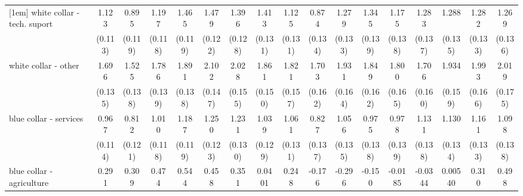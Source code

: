 {\begin{tabular}{l*{16}{c}}
[1em]
white collar - tech. suport&       1.123\sym{***}&       0.895\sym{***}&       1.197\sym{***}&       1.465\sym{***}&       1.479\sym{***}&       1.396\sym{***}&       1.413\sym{***}&       1.125\sym{***}&       0.874\sym{***}&       1.279\sym{***}&       1.345\sym{***}&       1.175\sym{***}&       1.283\sym{***}&       1.288\sym{***}&       1.282\sym{***}&       1.269\sym{***}\\
                    &     (0.113)         &     (0.119)         &     (0.118)         &     (0.119)         &     (0.122)         &     (0.128)         &     (0.131)         &     (0.131)         &     (0.134)         &     (0.133)         &     (0.139)         &     (0.138)         &     (0.137)         &     (0.135)         &     (0.133)         &     (0.136)         \\
[1em]
white collar - other&       1.696\sym{***}&       1.525\sym{***}&       1.786\sym{***}&       1.891\sym{***}&       2.102\sym{***}&       2.028\sym{***}&       1.861\sym{***}&       1.821\sym{***}&       1.703\sym{***}&       1.931\sym{***}&       1.849\sym{***}&       1.800\sym{***}&       1.706\sym{***}&       1.934\sym{***}&       1.993\sym{***}&       2.019\sym{***}\\
                    &     (0.135)         &     (0.138)         &     (0.139)         &     (0.138)         &     (0.147)         &     (0.155)         &     (0.150)         &     (0.157)         &     (0.162)         &     (0.164)         &     (0.162)         &     (0.165)         &     (0.160)         &     (0.159)         &     (0.166)         &     (0.175)         \\
[1em]
blue collar - services&       0.967\sym{***}&       0.812\sym{***}&       1.010\sym{***}&       1.187\sym{***}&       1.250\sym{***}&       1.231\sym{***}&       1.039\sym{***}&       1.061\sym{***}&       0.827\sym{***}&       1.056\sym{***}&       0.975\sym{***}&       0.978\sym{***}&       1.131\sym{***}&       1.130\sym{***}&       1.161\sym{***}&       1.098\sym{***}\\
                    &     (0.114)         &     (0.121)         &     (0.118)         &     (0.119)         &     (0.123)         &     (0.130)         &     (0.129)         &     (0.131)         &     (0.137)         &     (0.135)         &     (0.138)         &     (0.139)         &     (0.138)         &     (0.134)         &     (0.133)         &     (0.138)         \\
[1em]
blue collar - agriculture&       0.291         &       0.309         &       0.474\sym{**} &       0.544\sym{**} &       0.458\sym{*}  &       0.351         &      0.0401         &       0.248         &      -0.176         &      -0.296         &      -0.150         &     -0.0185         &     -0.0344         &     0.00540         &       0.310         &       0.498\sym{*}  \\

\end{tabular}}

